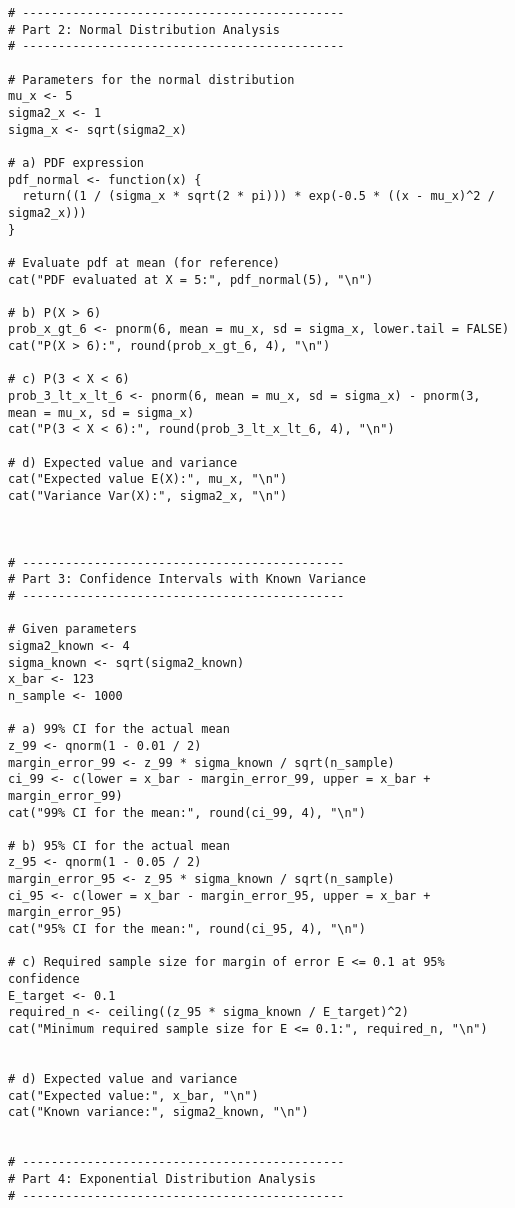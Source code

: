 \documentclass[12pt]{article}
\begin{document}
\begin{verbatim}
# ---------------------------------------------
# Part 2: Normal Distribution Analysis
# ---------------------------------------------

# Parameters for the normal distribution
mu_x <- 5
sigma2_x <- 1
sigma_x <- sqrt(sigma2_x)

# a) PDF expression
pdf_normal <- function(x) {
  return((1 / (sigma_x * sqrt(2 * pi))) * exp(-0.5 * ((x - mu_x)^2 / sigma2_x)))
}

# Evaluate pdf at mean (for reference)
cat("PDF evaluated at X = 5:", pdf_normal(5), "\n")

# b) P(X > 6)
prob_x_gt_6 <- pnorm(6, mean = mu_x, sd = sigma_x, lower.tail = FALSE)
cat("P(X > 6):", round(prob_x_gt_6, 4), "\n")

# c) P(3 < X < 6)
prob_3_lt_x_lt_6 <- pnorm(6, mean = mu_x, sd = sigma_x) - pnorm(3, mean = mu_x, sd = sigma_x)
cat("P(3 < X < 6):", round(prob_3_lt_x_lt_6, 4), "\n")

# d) Expected value and variance
cat("Expected value E(X):", mu_x, "\n")
cat("Variance Var(X):", sigma2_x, "\n")



# ---------------------------------------------
# Part 3: Confidence Intervals with Known Variance
# ---------------------------------------------

# Given parameters
sigma2_known <- 4
sigma_known <- sqrt(sigma2_known)
x_bar <- 123
n_sample <- 1000

# a) 99% CI for the actual mean
z_99 <- qnorm(1 - 0.01 / 2)
margin_error_99 <- z_99 * sigma_known / sqrt(n_sample)
ci_99 <- c(lower = x_bar - margin_error_99, upper = x_bar + margin_error_99)
cat("99% CI for the mean:", round(ci_99, 4), "\n")

# b) 95% CI for the actual mean
z_95 <- qnorm(1 - 0.05 / 2)
margin_error_95 <- z_95 * sigma_known / sqrt(n_sample)
ci_95 <- c(lower = x_bar - margin_error_95, upper = x_bar + margin_error_95)
cat("95% CI for the mean:", round(ci_95, 4), "\n")

# c) Required sample size for margin of error E <= 0.1 at 95% confidence
E_target <- 0.1
required_n <- ceiling((z_95 * sigma_known / E_target)^2)
cat("Minimum required sample size for E <= 0.1:", required_n, "\n")


# d) Expected value and variance
cat("Expected value:", x_bar, "\n")
cat("Known variance:", sigma2_known, "\n")


# ---------------------------------------------
# Part 4: Exponential Distribution Analysis
# ---------------------------------------------


\end{verbatim}
\end{document}

